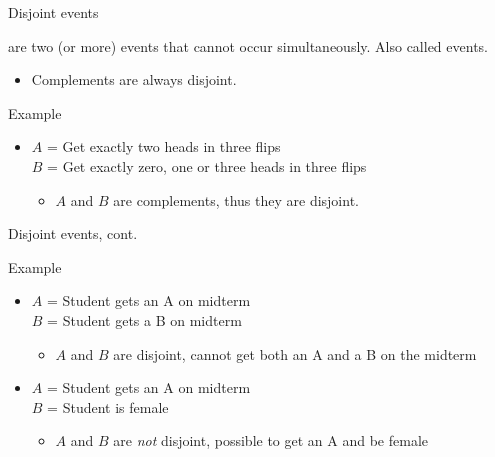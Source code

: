 \documentclass[xcolor=table, aspectratio=169, bigger, handout]{beamer}
\begin{document}
\begin{frame}{Disjoint events}
\begin{block}{}
 are two (or more) events that cannot occur simultaneously. Also called  events.
\begin{itemize}
\pause
\item Complements are always disjoint.
\end{itemize}
\end{block}

\pause
\begin{exampleblock}{Example}
\begin{itemize}
\item $A$ = Get exactly two heads in three flips\\
$B$ = Get exactly zero, one or three heads in three flips\\
\pause
\begin{itemize}
\item $A$ and $B$ are complements, thus they are disjoint.
\end{itemize}

\end{itemize}

\end{exampleblock}
\end{frame}

\begin{frame}{Disjoint events, cont.}
\begin{exampleblock}{Example}
\begin{itemize}
\item $A$ = Student gets an A on midterm\\
$B$ = Student gets a B on midterm\\
\pause
\begin{itemize}
\item $A$ and $B$ are disjoint, cannot get both an A and a B on the midterm
\end{itemize}

\pause
\item $A$ = Student gets an A on midterm\\
$B$ = Student is female\\
\pause
\begin{itemize}
\item $A$ and $B$ are \emph{not} disjoint, possible to get an A and be female
\end{itemize}
\end{itemize}

\end{exampleblock}
\end{frame}
\end{document}
